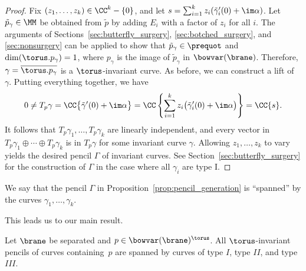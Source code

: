 \begin{proof}
Fix $(z_1, \dots , z_k) \in \CC^k - \{0\}$, and let $s = \sum_{i=1}^k z_i (\tilde{\gamma}_i'(0) + \im\alpha)$. Let $\tilde{p}_\gamma \in \MM$ be obtained from $\tilde{p}$ by adding $E_i$ with a factor of $z_i$ for all $i$.
The arguments of Sections~\ref{sec:butterfly_surgery}, \ref{sec:botched_surgery}, and \ref{sec:nonsurgery} can be applied to show that $\tilde{p}_\gamma \in \prequot$ and $\dim(\torus.p_\gamma) = 1$, where $p_\gamma$ is the image of $\tilde{p}_\gamma$ in $\bowvar(\brane)$. Therefore, $\gamma = \overline{\torus.p_\gamma}$ is a $\torus$-invariant curve. As before, we can construct a lift  of~$\gamma$. Putting everything together, we have
\[
0 \neq T_p\gamma = \CC\big\{ \tilde{\gamma}'(0) + \im\alpha \big\} = \CC \left\{ \sum_{i=1}^k z_i \bigl( \tilde{\gamma}_i'(0) + \im\alpha \bigr) \right\} = \CC \{s\}.
\]
It follows that $T_p\gamma_1, \dots , T_p\gamma_k$ are linearly independent, and every vector in $T_p\gamma_1 \oplus \cdots \oplus T_p\gamma_k$ is in $T_p\gamma$ for some invariant curve $\gamma$. Allowing $z_1, \dots , z_k$ to vary yields the desired pencil $\Gamma$ of invariant curves.
See Section~\ref{sec:butterfly_surgery} for the construction of $\Gamma$ in the case where all $\gamma_i$ are type I.
\end{proof}

\begin{Definition} \label{def:spanned}
We say that the pencil $\Gamma$ in Proposition~{\rm\ref{prop:pencil_generation}} is ``spanned'' by the curves $\gamma_1,\allowbreak \dots , \gamma_k$.
\end{Definition}

 This leads us to our main result.

\begin{Theorem} \label{thm:curves}
Let $\brane$ be separated and $p\in\bowvar(\brane)^\torus$. All $\torus$-invariant pencils of curves containing~$p$ are spanned by curves of type $I$, type $II$, and type $III$.
\end{Theorem}

